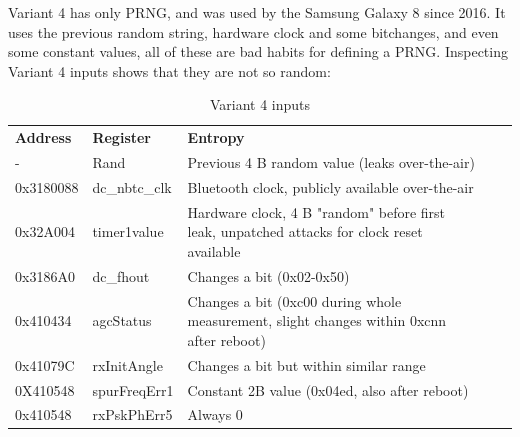     \break
    Variant 4 has only PRNG, and was used by the Samsung Galaxy 8 since 2016.
    It uses the previous random string, hardware clock and some bitchanges, and even some constant values, all of these are bad habits for defining a PRNG.
    Inspecting Variant 4 inputs shows that they are not so random:
    
    
    \begin{table}[htb]
                    \caption{Variant 4 inputs}
                    \begin{adjustbox}{width=\textwidth}

        \begin{tabular}{|l|l|l|ll}
            \cline{1-3}
            \textbf{Address} & \textbf{Register} & \textbf{Entropy}                                                                               &  &  \\ \cline{1-3}
            -                & Rand              & Previous 4   B random value (leaks over-the-air)                                               &  &  \\ \cline{1-3}
            0x3180088        & dc\_nbtc\_clk     & Bluetooth  clock, publicly available over-the-air                                              &  &  \\ \cline{1-3}
            0x32A004         & timer1value       & Hardware   clock, 4 B "random" before first leak, unpatched  attacks for clock reset available &  &  \\ \cline{1-3}
            0x3186A0         & dc\_fhout         & Changes a   bit (0x02-0x50)                                                                    &  &  \\ \cline{1-3}
            0x410434         & agcStatus         & Changes a   bit (0xc00 during whole measurement, slight changes within 0xcnn after   reboot)   &  &  \\ \cline{1-3}
            0x41079C         & rxInitAngle       & Changes a   bit but within similar range                                                       &  &  \\ \cline{1-3}
            0X410548         & spurFreqErr1      & Constant   2B value (0x04ed, also after reboot)                                                &  &  \\ \cline{1-3}
            0x410548         & rxPskPhErr5       & Always 0                                                                                       &  &  \\ \cline{1-3}
        \end{tabular}
    \end{adjustbox}

    \end{table}
    
